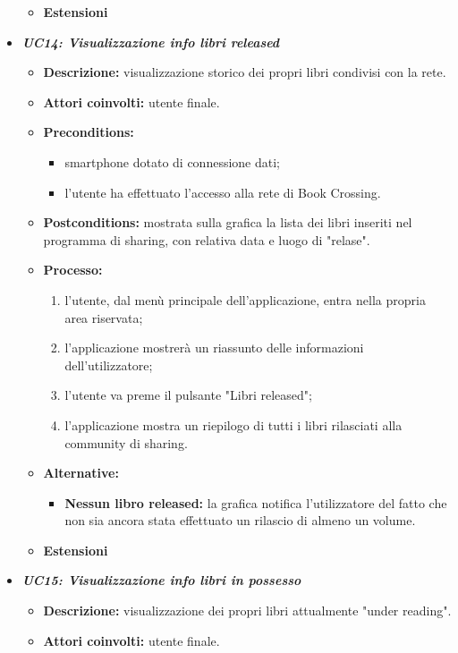\begin{itemize}
\begin{itemize}
		\item \textbf{Estensioni}
	\end{itemize}
	\item \textbf{\textit{UC14: Visualizzazione info libri released}}
	\begin{itemize}
		\item \textbf{Descrizione:} visualizzazione storico dei propri libri condivisi con la rete.
		\item \textbf{Attori coinvolti:}  utente finale.
		\item \textbf{Preconditions:}
		\begin{itemize}
			\item smartphone dotato di connessione dati;
			\item l’utente ha effettuato l’accesso alla rete di Book Crossing.
		\end{itemize}
		\item \textbf{Postconditions:} mostrata sulla grafica la lista dei libri inseriti nel programma di sharing, con relativa data e luogo di "relase".
		\item \textbf{Processo:}
		\begin{enumerate}
			\item l'utente, dal menù principale dell'applicazione, entra nella propria area riservata;
			\item l'applicazione mostrerà un riassunto delle informazioni dell'utilizzatore;
			\item l'utente va preme il pulsante "Libri released";
			\item l'applicazione mostra un riepilogo di tutti i libri rilasciati alla community di sharing.
		\end{enumerate}
		\item \textbf{Alternative:}
		\begin{itemize}
			\item \textbf{Nessun libro released:} la grafica notifica l'utilizzatore del fatto che non sia ancora stata effettuato un rilascio di almeno un volume.
		\end{itemize}
		\item \textbf{Estensioni}
	\end{itemize}
	\item \textbf{\textit{UC15: Visualizzazione info libri in possesso}}
	\begin{itemize}
		\item \textbf{Descrizione:} visualizzazione dei propri libri attualmente "under reading".
		\item \textbf{Attori coinvolti:}  utente finale.

\end{itemize}
\end{itemize}
